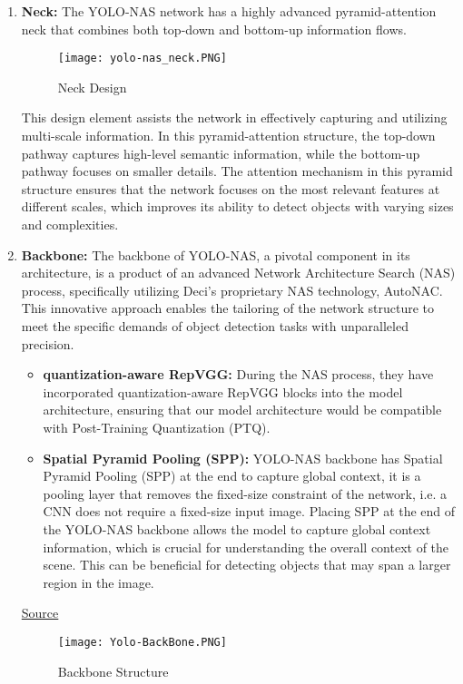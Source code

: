 \begin{enumerate}
    \item \textbf{Neck: } The YOLO-NAS network has a highly advanced pyramid-attention neck that combines both top-down and bottom-up information flows. 
    \begin{figure}[H]
        \centering
        \texttt{[image: yolo-nas\_neck.PNG]}
        \caption{Neck Design}
        \label{fig:Neck}
    \end{figure}
    This design element assists the network in effectively capturing and utilizing multi-scale information. In this pyramid-attention structure, the top-down pathway captures high-level semantic information, while the bottom-up pathway focuses on smaller details. The attention mechanism in this pyramid structure ensures that the network focuses on the most relevant features at different scales, which improves its ability to detect objects with varying sizes and complexities. 
    \item \textbf{Backbone: } 
The backbone of YOLO-NAS, a pivotal component in its architecture, is a product of an advanced Network Architecture Search (NAS) process, specifically utilizing Deci’s proprietary NAS technology, AutoNAC. This innovative approach enables the tailoring of the network structure to meet the specific demands of object detection tasks with unparalleled precision.
\begin{itemize}
    \item \textbf{quantization-aware RepVGG: } During the NAS process, they have incorporated quantization-aware RepVGG blocks into the model architecture, ensuring that our model architecture would be compatible with Post-Training Quantization (PTQ).\\
    \item \textbf{Spatial Pyramid Pooling (SPP): } YOLO-NAS backbone has Spatial Pyramid Pooling (SPP)  at the end to capture global context, it is a pooling layer that removes the fixed-size constraint of the network, i.e. a CNN does not require a fixed-size input image. Placing SPP at the end of the YOLO-NAS backbone allows the model to capture global context information, which is crucial for understanding the overall context of the scene. This can be beneficial for detecting objects that may span a larger region in the image.
\end{itemize}

\href{https://deci.ai/blog/yolo-nas-object-detection-foundation-model/}{Source}

\begin{figure}[H]
    \centering
    \texttt{[image: Yolo-BackBone.PNG]}
    \caption{Backbone Structure}
    \label{fig:BackBone}
\end{figure}


\end{enumerate}
